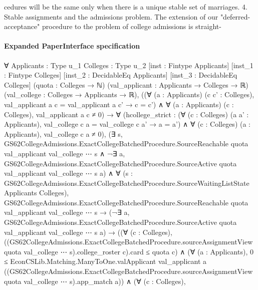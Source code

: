 \documentclass[10pt]{article}
\begin{document}
\begin{ReviewVerbatim}

cedures will be the same only when there is a unique stable set of marriages.
   4. Stable assignments and the admissions problem. The extension of our
"deferred-acceptance" procedure to the problem of college admissions is straight-
\end{ReviewVerbatim}


\paragraph{Expanded PaperInterface specification}
\begin{ReviewVerbatim}
∀ {Applicants : Type u_1} {Colleges : Type u_2} [inst : Fintype Applicants] [inst_1 : Fintype Colleges]
  [inst_2 : DecidableEq Applicants] [inst_3 : DecidableEq Colleges] (quota : Colleges → ℕ)
  (val_applicant : Applicants → Colleges → ℝ) (val_college : Colleges → Applicants → ℝ),
  ((∀ (a : Applicants) (c c' : Colleges), val_applicant a c = val_applicant a c' → c = c') ∧
      ∀ (a : Applicants) (c : Colleges), val_applicant a c ≠ 0) →
    ∀
      (hcollege_strict :
        (∀ (c : Colleges) (a a' : Applicants), val_college c a = val_college c a' → a = a') ∧
          ∀ (c : Colleges) (a : Applicants), val_college c a ≠ 0),
      (∃ s,
          GS62CollegeAdmissions.ExactCollegeBatchedProcedure.SourceReachable quota val_applicant val_college ⋯ s ∧
            ¬∃ a,
                GS62CollegeAdmissions.ExactCollegeBatchedProcedure.SourceActive quota val_applicant val_college ⋯ s a) ∧
        ∀ (s : GS62CollegeAdmissions.ExactCollegeBatchedProcedure.SourceWaitingListState Applicants Colleges),
          GS62CollegeAdmissions.ExactCollegeBatchedProcedure.SourceReachable quota val_applicant val_college ⋯ s →
            (¬∃ a,
                  GS62CollegeAdmissions.ExactCollegeBatchedProcedure.SourceActive quota val_applicant val_college ⋯ s
                    a) →
              ((∀ (c : Colleges),
                    ((GS62CollegeAdmissions.ExactCollegeBatchedProcedure.sourceAssignmentView quota val_college ⋯
                              s).college_roster
                          c).card ≤
                      quota c) ∧
                  (∀ (a : Applicants),
                      0 ≤
                        EconCSLib.Matching.ManyToOne.valApplicant val_applicant a
                          ((GS62CollegeAdmissions.ExactCollegeBatchedProcedure.sourceAssignmentView quota val_college ⋯
                                s).app_match
                            a)) ∧
                    (∀ (c : Colleges),

\end{ReviewVerbatim}
\end{document}
